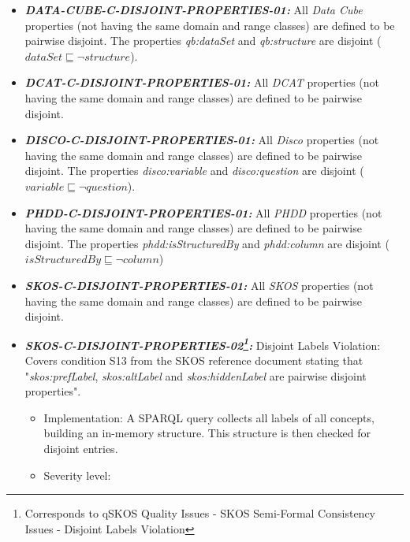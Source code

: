 \documentclass{llncs}
\begin{document}
\begin{itemize}
	\item \textbf{{\em DATA-CUBE-C-DISJOINT-PROPERTIES-01:}} 
	All \emph{Data Cube} properties (not having the same domain and range classes) are defined to be pairwise disjoint.
  The properties \emph{qb:dataSet} and \emph{qb:structure} are disjoint ($dataSet \sqsubseteq \neg structure$).
\end{itemize}

\begin{itemize}
	\item \textbf{{\em DCAT-C-DISJOINT-PROPERTIES-01:}} 
	All \emph{DCAT} properties (not having the same domain and range classes) are defined to be pairwise disjoint.
\end{itemize}

\begin{itemize}
	\item \textbf{{\em DISCO-C-DISJOINT-PROPERTIES-01:}} 
	All \emph{Disco} properties (not having the same domain and range classes) are defined to be pairwise disjoint.
  The properties \emph{disco:variable} and \emph{disco:question} are disjoint ($variable \sqsubseteq \neg question$).
\end{itemize}

\begin{itemize}
	\item \textbf{{\em PHDD-C-DISJOINT-PROPERTIES-01:}} 
	All \emph{PHDD} properties (not having the same domain and range classes) are defined to be pairwise disjoint.
	The properties \emph{phdd:isStructuredBy} and \emph{phdd:column} are disjoint ($isStructuredBy \sqsubseteq \neg column$)
\end{itemize}

\begin{itemize}

	\item \textbf{{\em SKOS-C-DISJOINT-PROPERTIES-01:}} 
	All \emph{SKOS} properties (not having the same domain and range classes) are defined to be pairwise disjoint.
	
	\item \textbf{{\em SKOS-C-DISJOINT-PROPERTIES-02\footnote{Corresponds to qSKOS Quality Issues - SKOS Semi-Formal Consistency Issues - Disjoint Labels Violation}:}}
	Disjoint Labels Violation:
  Covers condition S13 from the SKOS reference document stating that "\emph{skos:prefLabel}, \emph{skos:altLabel} and \emph{skos:hiddenLabel} are pairwise disjoint properties". 
	\begin{itemize}
	  \item Implementation:
		A SPARQL query collects all labels of all concepts, building an in-memory structure. This structure is then checked for disjoint entries. 
		\item Severity level: 
	\end{itemize}
	
\end{itemize}
\end{document}

